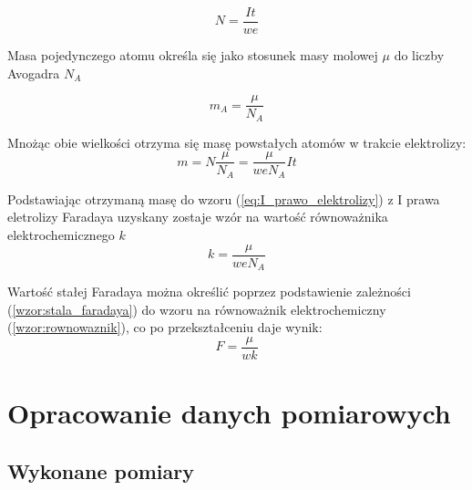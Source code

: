 \documentclass[a4paper,12pts]{article}
\begin{document}
	\begin{equation}
		N = \frac{It}{we}
	\end{equation}
	
	\newpage
	Masa pojedynczego atomu określa się jako stosunek masy molowej $\mu$ do liczby Avogadra $N_A$
	
	\begin{equation}
		m_A = \frac{\mu}{N_A}
	\end{equation}
	
	Mnożąc obie wielkości otrzyma się masę powstałych atomów w trakcie elektrolizy:
	\begin{equation}
		m = N \frac{\mu}{N_A} = \frac{\mu}{weN_A} It
	\end{equation}
	
	Podstawiając otrzymaną masę do wzoru (\ref{eq:I_prawo_elektrolizy}) z I prawa eletrolizy Faradaya uzyskany zostaje wzór na wartość równoważnika elektrochemicznego $k$
	\begin{equation}
		k = \frac{\mu}{weN_A}
		\label{wzor:rownowaznik}
	\end{equation}
	
	Wartość stałej Faradaya można określić poprzez podstawienie zależności (\ref{wzor:stala_faradaya}) do wzoru na równoważnik elektrochemiczny (\ref{wzor:rownowaznik}), co po przekształceniu daje wynik:
	\begin{equation}
		F = \frac{\mu}{wk}
	\end{equation}
	
	
\section{Opracowanie danych pomiarowych}

\subsection{Wykonane pomiary}
\end{document}
